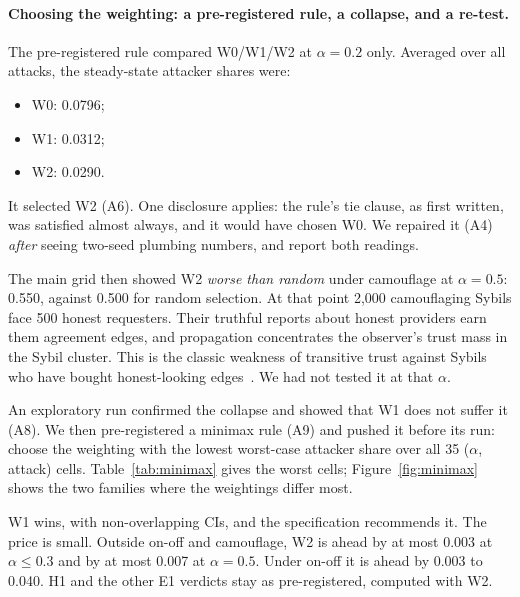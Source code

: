 \paragraph{Choosing the weighting: a pre-registered rule, a collapse,
and a re-test.}
The pre-registered rule compared W0/W1/W2 at $\alpha{=}0.2$ only.
Averaged over all attacks, the steady-state attacker shares were:
\begin{itemize}
\item W0: 0.0796;
\item W1: 0.0312;
\item W2: 0.0290.
\end{itemize}
It selected W2 (A6). One disclosure applies: the rule's tie clause, as
first written, was satisfied almost always, and it would have chosen W0.
We repaired it (A4) \emph{after} seeing two-seed plumbing numbers, and
report both readings.

The main grid then showed W2 \emph{worse than random} under camouflage
at $\alpha{=}0.5$: 0.550, against 0.500 for random selection. At that
point 2,000 camouflaging Sybils face 500 honest requesters. Their
truthful reports about honest providers earn them agreement edges, and
propagation concentrates the observer's trust mass in the Sybil cluster.
This is the classic weakness of transitive trust against Sybils who have
bought honest-looking edges~\cite{yu2006sybilguard,cheng2005sybilproof}.
We had not tested it at that $\alpha$.

An exploratory run confirmed the collapse and showed that W1 does not
suffer it (A8). We then pre-registered a minimax rule (A9) and pushed it
before its run: choose the weighting with the lowest worst-case attacker
share over all 35 ($\alpha$, attack) cells. Table~\ref{tab:minimax}
gives the worst cells; Figure~\ref{fig:minimax} shows the two families
where the weightings differ most.

W1 wins, with non-overlapping CIs, and the specification recommends it.
The price is small. Outside on-off and camouflage, W2 is ahead by at most
0.003 at $\alpha\le0.3$ and by at most 0.007 at $\alpha{=}0.5$. Under
on-off it is ahead by 0.003 to 0.040. H1 and the other E1
verdicts stay as pre-registered, computed with W2.

